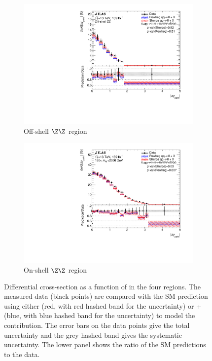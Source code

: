 \begin{figure}[H]
\begin{subfigure}{.49\textwidth}
      \includegraphics[width=.95\linewidth]{Figures/m4l/UnfoldedResults/linY_Unfolded_Data_deltaYPairs_m4loffshell.pdf}  \caption{Off-shell $\Z\Z$ region}\label{fig:sub-third}
    \end{subfigure}
    \begin{subfigure}{.49\textwidth}\centering
      \includegraphics[width=.95\linewidth]{Figures/m4l/UnfoldedResults/linY_Unfolded_Data_deltaYPairs_m4l180-2000.pdf}  \caption{On-shell $\Z\Z$ region}\label{fig:sub-fourth}
    \end{subfigure}
    \caption{Differential cross-section as a function of \dYPairs{} in the four
        \mFourL{} regions. The measured data (black points) are  compared with the SM prediction using either \SHERPA{} (red, with red hashed band for the uncertainty) or \POWHEG{} + \pythia{} (blue, with blue hashed band for the uncertainty) to model the \qqFourL{} contribution. The error bars on the data points give the total uncertainty and the grey hashed band gives the systematic uncertainty. \Pvalue{} The  lower panel shows the ratio of the SM predictions to the data.}
    \label{fig:dYPairs_m4l}
\end{figure}
